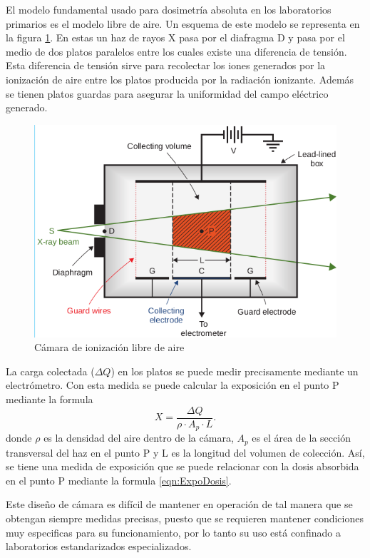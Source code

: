 El modelo fundamental usado para dosimetría absoluta en los laboratorios primarios es el modelo libre de aire. Un esquema de este modelo se representa en la figura  \ref{fig:freeAir}. En estas un haz de rayos X pasa por el diafragma D y pasa por el medio de dos platos paralelos entre los cuales existe una diferencia de tensión. Esta diferencia de tensión sirve para recolectar los iones generados por la ionización de aire entre los platos producida por la radiación ionizante. Además se tienen platos guardas para asegurar la uniformidad del campo eléctrico generado.\\
\begin{figure}[H]
	\centering
	\includegraphics[width=0.7\linewidth]{images/freeAirChamber.png}
	\caption{Cámara de ionización libre de aire\cite{khan2014the}}
	\label{fig:freeAir}
\end{figure}

La carga colectada ($\Delta Q$) en los platos se puede medir precisamente mediante un electrómetro. Con esta medida se puede calcular la exposición en el punto P mediante la formula \\
 \begin{equation}
X=\frac{\Delta Q}{\rho \cdot A_{p}\cdot L}.
\end{equation}
donde $\rho$ es la densidad del aire dentro de la cámara, $A_{p}$ es el área de la sección transversal del haz en el punto P y L es la longitud del volumen de colección. Así, se tiene una medida de exposición que se puede relacionar con la dosis absorbida en el punto P mediante la formula \eqref{eqn:ExpoDosis}.

Este diseño de cámara es difícil de mantener en operación de tal manera que se obtengan siempre medidas precisas, puesto que se requieren mantener condiciones muy especificas para su funcionamiento, por lo tanto su uso está confinado a laboratorios estandarizados especializados.\\
 
